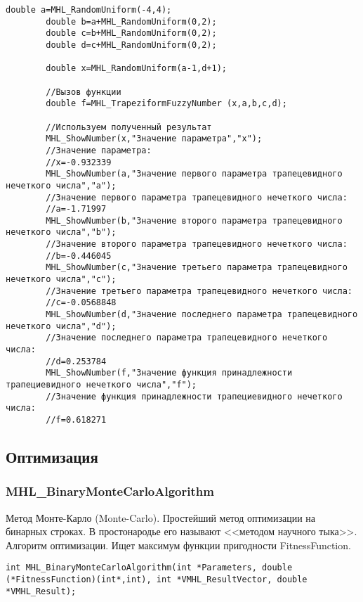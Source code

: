 \documentclass[a4paper,12pt]{article}
\begin{document}
\begin{lstlisting}[label=code_use_MHL_TrapeziformFuzzyNumber,caption=Пример использования]
        double a=MHL_RandomUniform(-4,4);
        double b=a+MHL_RandomUniform(0,2);
        double c=b+MHL_RandomUniform(0,2);
        double d=c+MHL_RandomUniform(0,2);

        double x=MHL_RandomUniform(a-1,d+1);

        //Вызов функции
        double f=MHL_TrapeziformFuzzyNumber (x,a,b,c,d);

        //Используем полученный результат
        MHL_ShowNumber(x,"Значение параметра","x");
        //Значение параметра:
        //x=-0.932339
        MHL_ShowNumber(a,"Значение первого параметра трапецевидного нечеткого числа","a");
        //Значение первого параметра трапецевидного нечеткого числа:
        //a=-1.71997
        MHL_ShowNumber(b,"Значение второго параметра трапецевидного нечеткого числа","b");
        //Значение второго параметра трапецевидного нечеткого числа:
        //b=-0.446045
        MHL_ShowNumber(c,"Значение третьего параметра трапецевидного нечеткого числа","c");
        //Значение третьего параметра трапецевидного нечеткого числа:
        //c=-0.0568848
        MHL_ShowNumber(d,"Значение последнего параметра трапецевидного нечеткого числа","d");
        //Значение последнего параметра трапецевидного нечеткого числа:
        //d=0.253784
        MHL_ShowNumber(f,"Значение функция принадлежности трапециевидного нечеткого числа","f");
        //Значение функция принадлежности трапециевидного нечеткого числа:
        //f=0.618271
\end{lstlisting}

\subsection{Оптимизация}

\subsubsection{MHL\_BinaryMonteCarloAlgorithm}\label{MHL_BinaryMonteCarloAlgorithm}

Метод Монте-Карло (Monte-Carlo). Простейший метод оптимизации на бинарных строках. В простонародье его называют <<методом научного тыка>>. Алгоритм оптимизации. Ищет максимум функции пригодности FitnessFunction.


\begin{lstlisting}[label=code_syntax_MHL_BinaryMonteCarloAlgorithm,caption=Синтаксис]
int MHL_BinaryMonteCarloAlgorithm(int *Parameters, double (*FitnessFunction)(int*,int), int *VMHL_ResultVector, double *VMHL_Result);
\end{lstlisting}
\end{document}
